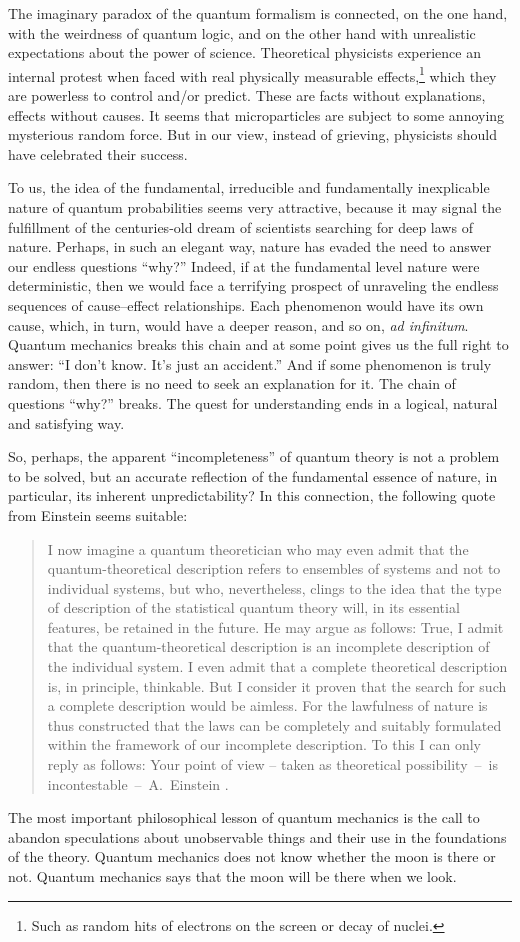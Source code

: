 \documentclass[nochecklpage]{stefan1}
\theoremstyle{definition}
\begin{document}
The imaginary paradox of the quantum formalism is connected, on the one
hand, with the weirdness of quantum logic, and on the other hand with
unrealistic expectations about the power of science. Theoretical
physicists experience an internal protest when faced with real
physically measurable effects,\footnote{Such as random hits of
electrons on the screen or decay of nuclei.} which they are powerless
to control and/or predict. These are facts without explanations, effects
without causes. It seems that microparticles are subject to some
annoying mysterious random force. But in our view, instead of grieving,
physicists should have celebrated their success.

To us, the idea of the fundamental, irreducible and fundamentally
inexplicable nature of quantum probabilities seems very attractive,
because it may signal the fulfillment of the centuries-old dream of
scientists searching for deep laws of nature. Perhaps, in such an
elegant way, nature has evaded the need to answer our endless questions
``why?'' Indeed, if at the fundamental level nature were deterministic,
then we would face a terrifying prospect of unraveling the endless
sequences of cause--effect relationships. Each phenomenon would have its
own cause, which, in turn, would have a deeper reason, and so on,
\emph{ad infinitum}. Quantum mechanics breaks this chain and at some point
gives us the full right to answer: ``I don't know. It's just an
accident.'' And if some phenomenon is truly random, then there is no
need to seek an explanation for it. The chain of questions ``why?''
breaks. The quest for understanding ends in a logical, natural and
satisfying way.

So, perhaps, the apparent ``incompleteness'' of quantum theory is not
a problem to be solved, but an accurate reflection of the fundamental
essence of nature, in particular, its inherent unpredictability? In this
connection, the following quote from Einstein seems suitable:
%
\begin{quote}
I now imagine a quantum theoretician who may even admit that the
quantum-theoretical description refers to ensembles of systems and not
to individual systems, but who, nevertheless, clings to the idea that
the type of description of the statistical quantum theory will, in its
essential features, be retained in the future. He may argue as follows:
True, I admit that the quantum-theoretical description is an incomplete
description of the individual system. I even admit that a complete
theoretical description is, in principle, thinkable. But I consider it
proven that the search for such a complete description would be aimless.
For the lawfulness of nature is thus constructed that the laws can be
completely and suitably formulated within the framework of our
incomplete description. To this I can only reply as follows: Your point
of view -- taken as theoretical
possibility~--~is incontestable~--~A.~Einstein \cite{incontestable}.
\end{quote}
%
The most important philosophical lesson of quantum mechanics is the call
to abandon speculations about unobservable things and their use in the
foundations of the theory. Quantum mechanics does not know whether the
moon is there or not. Quantum mechanics says that the moon will be there
when we look.
\end{document}
